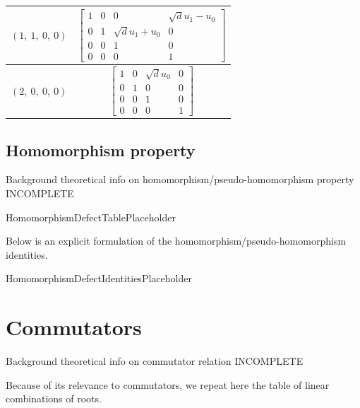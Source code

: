 \documentclass[11pt]{article}
\newcommand{\noi}{\noindent}
\theoremstyle{definition}
\begin{document}
\begin{tabular}{|l|c|}
    \hline
    $\left( 1, \  1, \  0, \  0\right)$ & $\left[\begin{matrix}1 & 0 & 0 & \sqrt{d} u_{1} - u_{0}\\0 & 1 & \sqrt{d} u_{1} + u_{0} & 0\\0 & 0 & 1 & 0\\0 & 0 & 0 & 1\end{matrix}\right]$ \\
    \hline
    $\left( 2, \  0, \  0, \  0\right)$ & $\left[\begin{matrix}1 & 0 & \sqrt{d} u_{0} & 0\\0 & 1 & 0 & 0\\0 & 0 & 1 & 0\\0 & 0 & 0 & 1\end{matrix}\right]$ \\
    \hline
\end{tabular}


\subsection{Homomorphism property}

\noi Background theoretical info on homomorphism/pseudo-homomorphism property INCOMPLETE

\bigskip

HomomorphismDefectTablePlaceholder

\noi Below is an explicit formulation of the homomorphism/pseudo-homomorphism identities.

\bigskip

HomomorphismDefectIdentitiesPlaceholder

\newpage
\section{Commutators}

\noi Background theoretical info on commutator relation INCOMPLETE

\noi Because of its relevance to commutators, we repeat here the table of linear combinations of roots.
\end{document}
